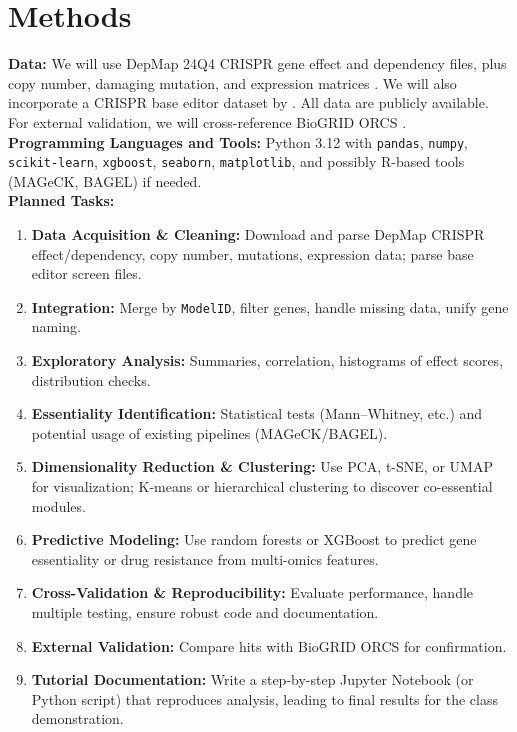 \documentclass[11pt,a4paper]{article}
\begin{document}
\section{Methods}
\noindent
\textbf{Data:} We will use DepMap 24Q4 CRISPR gene effect and dependency files, plus copy number, damaging mutation, and expression matrices \cite{depmap2024}. We will also incorporate a CRISPR base editor dataset by \cite{yanyyyy3}. All data are publicly available. For external validation, we will cross-reference BioGRID ORCS \cite{biogridORCS}.\\
\textbf{Programming Languages and Tools:} Python 3.12 with \texttt{pandas}, \texttt{numpy}, \texttt{scikit-learn}, \texttt{xgboost}, \texttt{seaborn}, \texttt{matplotlib}, and possibly R-based tools (MAGeCK, BAGEL) if needed.\\
\textbf{Planned Tasks:}
\begin{enumerate}
  \item \textbf{Data Acquisition \& Cleaning:} Download and parse DepMap CRISPR effect/dependency, copy number, mutations, expression data; parse base editor screen files.
  \item \textbf{Integration:} Merge by \texttt{ModelID}, filter genes, handle missing data, unify gene naming.
  \item \textbf{Exploratory Analysis:} Summaries, correlation, histograms of effect scores, distribution checks.
  \item \textbf{Essentiality Identification:} Statistical tests (Mann--Whitney, etc.) and potential usage of existing pipelines (MAGeCK/BAGEL).
  \item \textbf{Dimensionality Reduction \& Clustering:} Use PCA, t-SNE, or UMAP for visualization; K-means or hierarchical clustering to discover co-essential modules.
  \item \textbf{Predictive Modeling:} Use random forests or XGBoost to predict gene essentiality or drug resistance from multi-omics features.
  \item \textbf{Cross-Validation \& Reproducibility:} Evaluate performance, handle multiple testing, ensure robust code and documentation.
  \item \textbf{External Validation:} Compare hits with BioGRID ORCS for confirmation.
  \item \textbf{Tutorial Documentation:} Write a step-by-step Jupyter Notebook (or Python script) that reproduces analysis, leading to final results for the class demonstration.
\end{enumerate}

\nocite{huang2019}

\footnotesize

\end{document}
